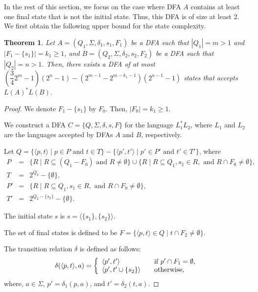 \documentclass[10pt]{article}
\newtheorem{theorem}{Theorem}
\begin{document}
In the rest of this section, we focus on the case where DFA $A$ contains at least one final state that is not the initial state.
Thus, this DFA is of size at least 2.
We first obtain the following upper bound for the state complexity.

\begin{theorem}\label{thm:star-cat-upper}
Let $A = (Q_1, \Sigma, \delta_1, s_1, F_1)$ be a DFA such that $|Q_1| = m > 1$ and $|F_1 - \{s_1\}| = k_1 \ge 1$, and $B = (Q_2, \Sigma, \delta_2, s_2, F_2)$ be a DFA such that $|Q_2| = n > 1$.
Then, there exists a DFA of at most $(\dfrac{3}{4}2^m - 1)(2^n-1) - (2^{m-1}-2^{m-k_1-1})(2^{n-1}-1)$ states that accepts $L(A)^* L(B)$.
\end{theorem}
\begin{proof}
We denote $F_1 - \{s_1\}$ by $F_0$. Then, $|F_0| = k_1 \ge 1$.

We construct a DFA $C = \{Q, \Sigma, \delta, s, F\}$ for the language $L_1^* L_2$, where $L_1$ and $L_2$ are the languages accepted by DFAs $A$ and $B$, respectively.

Let $Q = \{ \langle p, t \rangle \mid p \in P \mbox{ and } t \in T\} - \{\langle p', t' \rangle \mid p' \in P' \mbox{ and } t' \in T'\}$, where
\begin{eqnarray*}
    P & = & \{ R \mid R \subseteq (Q_1 - F_0) \mbox{ and } R \neq \emptyset\} \cup \{ R \mid R \subseteq Q_1, s_1 \in R, \mbox{ and } R \cap F_0 \neq \emptyset \},\\
    T & = &  2^{Q_2} - \{\emptyset\}, \\
    P' & = & \{ R \mid R \subseteq Q_1, s_1 \in R, \mbox{ and } R \cap F_0 \neq \emptyset \}, \\
    T' & = & 2^{Q_2 - \{s_2\}}- \{\emptyset\}.
\end{eqnarray*}

The initial state $s$ is $s = \langle \{s_1\}, \{s_2\}\rangle$.

The set of final states is defined to be $F = \{ \langle p, t\rangle \in Q \mid t \cap F_2 \neq \emptyset\}$.

The transition relation $\delta$ is defined as follows:
\[
\delta (\langle p,t \rangle, a) = \left\{
\begin{array}{l l}
  \langle p', t'\rangle & \quad \text{if $p' \cap F_1 = \emptyset$,}\\
  \langle p', t' \cup \{s_2\} \rangle & \quad \text{otherwise,}\\
\end{array} \right.
\]
where, $a \in \Sigma$, $p' = \delta_1(p, a)$, and $t' = \delta_2(t, a)$.


\end{proof}
\end{document}
